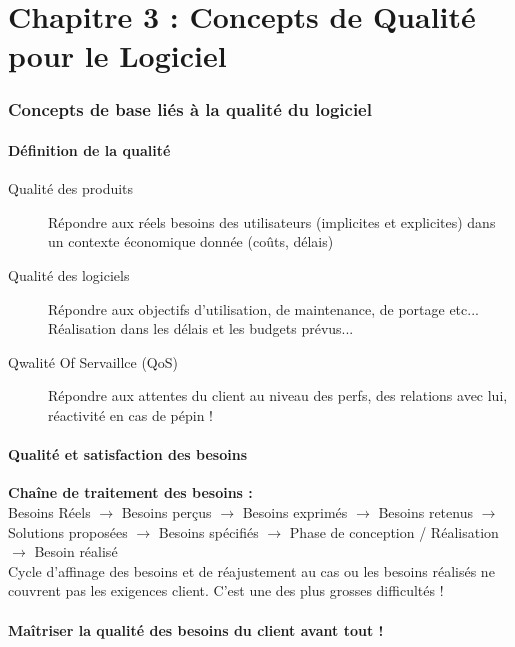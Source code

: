 \part{Chapitre 3 : Concepts de Qualité pour le Logiciel}

\section{Concepts de base liés à la qualité du logiciel}

	\subsection{Définition de la qualité}

	\begin{description}
    \item[Qualité des produits] Répondre aux réels besoins des utilisateurs (implicites et explicites) dans un contexte économique donnée (coûts, délais)
    \item[Qualité des logiciels] Répondre aux objectifs d’utilisation, de maintenance, de portage etc... Réalisation dans les délais et les budgets prévus...
    \item[Qwalité Of Servaillce (QoS)] Répondre aux attentes du client au niveau des perfs, des relations avec lui, réactivité en cas de pépin !
	\end{description}


   \subsection{Qualité et satisfaction des besoins}

\textbf{Chaîne de traitement des besoins :}\hfill\\

Besoins Réels $\rightarrow$ Besoins perçus $\rightarrow$ Besoins exprimés $\rightarrow$ Besoins retenus  $\rightarrow$  Solutions proposées $\rightarrow$ Besoins spécifiés $\rightarrow$ Phase de conception / Réalisation $\rightarrow$ Besoin réalisé\\

Cycle d’affinage des besoins et de réajustement au cas ou les besoins réalisés ne couvrent pas les exigences client. C’est une des plus grosses difficultés !\\

   \subsection{Maîtriser la qualité des besoins du client avant tout !}

